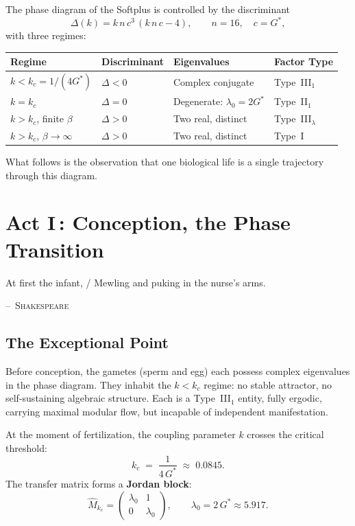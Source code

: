 \documentclass[12pt, letterpaper]{article}
\theoremstyle{plain}
\theoremstyle{definition}
\theoremstyle{remark}
\newcommand{\Gstar}{{G^{*}}}              %
\begin{document}
The phase diagram of the Softplus is controlled by the discriminant
\begin{equation}\label{eq:discriminant}
  \Delta(k) = k\,n\,c^3\,(k\,n\,c - 4),
  \qquad n = 16,\quad c = \Gstar,
\end{equation}
with three regimes:
\begin{center}
\renewcommand{\arraystretch}{1.4}
\begin{tabular}{@{}llll@{}}
\toprule
\textbf{Regime} & \textbf{Discriminant} & \textbf{Eigenvalues} & \textbf{Factor Type} \\
\midrule
$k < k_c = 1/(4\Gstar)$ & $\Delta < 0$ & Complex conjugate & Type~III$_1$ \\
$k = k_c$                & $\Delta = 0$ & Degenerate: $\lambda_0 = 2\Gstar$ & Type~II$_1$ \\
$k > k_c$, finite $\beta$ & $\Delta > 0$ & Two real, distinct & Type~III$_\lambda$ \\
$k > k_c$, $\beta \to \infty$ & $\Delta > 0$ & Two real, distinct & Type~I \\
\bottomrule
\end{tabular}
\end{center}

\medskip
\noindent
What follows is the observation that one biological life is a single trajectory through this diagram.


\section{\texorpdfstring{Act I\,: Conception, the Phase Transition}{Act I: Conception, the Phase Transition}}
\label{sec:act1}

\epigraph{At first the infant, / Mewling and puking in the nurse's arms.}{\textsc{--~Shakespeare}}

\subsection{The Exceptional Point}

Before conception, the gametes (sperm and egg) each possess complex eigenvalues in the phase diagram. They inhabit the $k < k_c$ regime: no stable attractor, no self-sustaining algebraic structure. Each is a Type~III$_1$ entity, fully ergodic, carrying maximal modular flow, but incapable of independent manifestation.

At the moment of fertilization, the coupling parameter $k$ crosses the critical threshold:
\begin{equation}\label{eq:kcrit}
  k_c \;=\; \frac{1}{4\,\Gstar} \;\approx\; 0.0845.
\end{equation}
The transfer matrix forms a \textbf{Jordan block}:
\begin{equation}\label{eq:jordan}
  \hat{M}_{k_c} = \begin{pmatrix} \lambda_0 & 1 \\ 0 & \lambda_0 \end{pmatrix},
  \qquad \lambda_0 = 2\,\Gstar \approx 5.917.
\end{equation}
\end{document}
